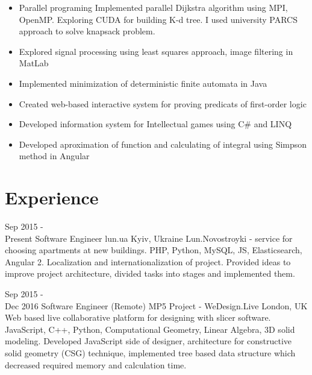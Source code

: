 \documentclass[letterpaper]{twentysecondcv} %
\begin{document}
\begin{itemize}
        {}
    \item \projectItem
        {Parallel programing}
        {Implemented parallel Dijkstra algorithm using MPI, OpenMP. Exploring CUDA for building K-d tree. I used university PARCS approach to solve knapsack problem.}
    \item \projectItem
        {Explored signal processing using least squares approach, image filtering in MatLab}
        {}
    \item \projectItem
        {Implemented minimization of deterministic finite automata in Java}
        {}
    \item \projectItem
        {Created web-based interactive system for proving predicats of first-order logic}
        {}
    \item \projectItem
        {Developed information system for Intellectual games using C\# and LINQ }
        {}
    \item \projectItem
        {Developed aproximation of function and calculating of integral using Simpson method in Angular }
        {}
\end{itemize}

\section{Experience}

\begin{twenty} %
	\twentyitem
    	{Sep 2015 - \\Present}
        {Software Engineer}
        {lun.ua}
        {Kyiv, Ukraine}
        {Lun.Novostroyki - service for choosing apartments at new buildings.
        {
        PHP, Python, MySQL, JS, Elasticsearch, Angular 2. Localization and internationalization of project. Provided ideas to improve project architecture, divided tasks into stages and implemented them. 
        }
        }
        
    \twentyitem
   	{Sep 2015 - \\Dec 2016}
        {Software Engineer (Remote)}
        {MP5 Project - WeDesign.Live}
        {London, UK}
        {Web based live collaborative platform for designing with slicer software.
        {JavaScript, C++, Python, Computational Geometry, Linear Algebra,  3D solid modeling. Developed JavaScript side of designer, architecture for constructive solid geometry (CSG) technique, implemented tree based data structure which decreased required memory and calculation time.
        }
        }
\end{twenty}
\end{document}
